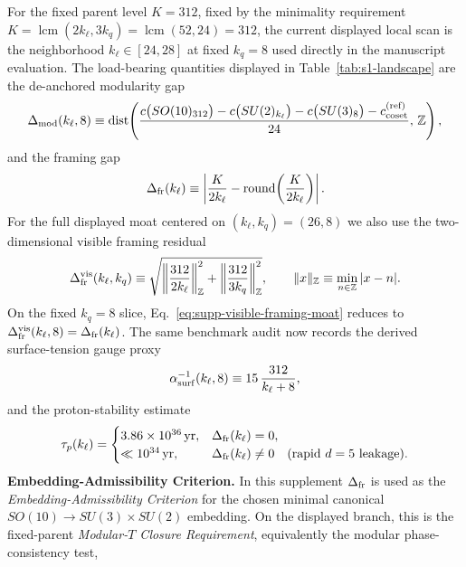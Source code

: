 \documentclass[11pt]{article}
\begin{document}
For the fixed parent level $K=312$, fixed by the minimality requirement $K=\operatorname{lcm}(2k_{\ell},3k_q)=\operatorname{lcm}(52,24)=312$, the current displayed local scan is the neighborhood $k_{\ell}\in[24,28]$ at fixed $k_q=8$ used directly in the manuscript evaluation. The load-bearing quantities displayed in Table~\ref{tab:s1-landscape} are the de-anchored modularity gap
\begin{equation}
 \Delta_{\rm mod}(k_{\ell},8)
 \equiv
 \mathrm{dist}\!\left(
 \frac{c\bigl(SO(10)_{312}\bigr)-c\bigl(SU(2)_{k_{\ell}}\bigr)-c\bigl(SU(3)_8\bigr)-c_{\rm coset}^{\rm(ref)}}{24},\,\mathbb Z
 \right),
\end{equation}
and the framing gap
\begin{equation}
 \Delta_{\rm fr}(k_{\ell})
 \equiv
 \left| \frac{K}{2k_{\ell}} - \text{round}\!\left(\frac{K}{2k_{\ell}}\right) \right|.
\end{equation}
For the full displayed moat centered on $(k_{\ell},k_q)=(26,8)$ we also use the
two-dimensional visible framing residual
\begin{equation}
\label{eq:supp-visible-framing-moat}
 \Delta_{\rm fr}^{\rm vis}(k_{\ell},k_q)
 \equiv
 \sqrt{
 \left\|\frac{312}{2k_{\ell}}\right\|_{\mathbb Z}^2
 +
 \left\|\frac{312}{3k_q}\right\|_{\mathbb Z}^2},
 \qquad
 \|x\|_{\mathbb Z}\equiv\min_{n\in\mathbb Z}|x-n|.
\end{equation}
On the fixed $k_q=8$ slice, Eq.~\eqref{eq:supp-visible-framing-moat} reduces to
$\Delta_{\rm fr}^{\rm vis}(k_{\ell},8)=\Delta_{\rm fr}(k_{\ell})$.
The same benchmark audit now records the derived surface-tension gauge proxy
\begin{equation}
 \alpha^{-1}_{\rm surf}(k_{\ell},8)
 \equiv
 15\,\frac{312}{k_{\ell}+8},
\end{equation}
and the proton-stability estimate
\begin{equation}
 \tau_p(k_{\ell})
 =
 \begin{cases}
  3.86\times10^{36}\,\mathrm{yr}, & \Delta_{\rm fr}(k_{\ell})=0,\\
  \ll 10^{34}\,\mathrm{yr}, & \Delta_{\rm fr}(k_{\ell})\neq0\quad\text{(rapid $d=5$ leakage).}
 \end{cases}
\end{equation}
\medskip
\noindent\textbf{Embedding-Admissibility Criterion.}
In this supplement $\Delta_{\rm fr}$ is used as the \emph{Embedding-Admissibility Criterion} for the chosen minimal canonical $SO(10)\to SU(3)\times SU(2)$ embedding. On the displayed branch, this is the fixed-parent \emph{Modular-$T$ Closure Requirement}, equivalently the modular phase-consistency test,
\end{document}
